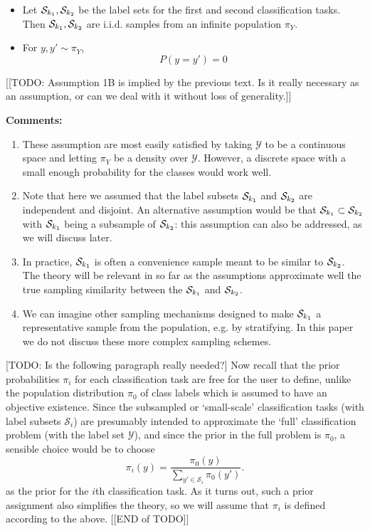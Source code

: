 \documentclass[12pt]{article}
\begin{document}
\begin{itemize}
\item[Assumption 1A] Let $\mathcal{S}_{k_1}, \mathcal{S}_{k_2}$ be the label sets
for the first and second classification tasks. Then $\mathcal{S}_{k_1}, 
\mathcal{S}_{k_2}$ are i.i.d. samples from an infinite population $\pi_Y$.
\item[Assumption 1B] For $y,y'\sim \pi_Y$, 
\[P(y=y')=0\]
\end{itemize}
[[TODO: Assumption 1B is implied by the previous text. Is it really necessary as an assumption, or can we deal with it without loss of generality.]]

\textbf{Comments:}
\begin{enumerate}
\item These assumption are most easily satisfied by taking $\mathcal{Y}$ 
to be a continuous space and letting $\pi_Y$ be a density over $\mathcal{Y}$. However, a discrete space with a small enough 
probability for the classes would work well. 
\item Note that here we assumed that the label subsets $\mathcal{S}_{k_1}$ and
$\mathcal{S}_{k_2}$ are independent and disjoint. An alternative
assumption would be that $\mathcal{S}_{k_1} \subset
\mathcal{S}_{k_2}$ with $\mathcal{S}_{k_1}$ being a subsample of
$\mathcal{S}_{k_2}$: this assumption can also be addressed, as we will
discuss later.
\item 
In practice, $\mathcal{S}_{k_1}$ is often a convenience sample meant to be similar to $\mathcal{S}_{k_2}$. The theory will be relevant in so far as the assumptions approximate well the true sampling similarity between the $\mathcal{S}_{k_1}$ and $\mathcal{S}_{k_2}$. 
\item We can imagine other sampling mechanisms designed to make $\mathcal{S}_{k_1}$ a representative sample from the population, e.g. by stratifying. In this paper we do not discuss these more complex sampling schemes. 
\end{enumerate}

[TODO: Is the following paragraph really needed?]
Now recall that the prior probabilities $\pi_i$ for each
classification task are free for the user to define, unlike the
population distribution $\pi_0$ of class labels which is assumed to
have an objective existence.  Since the subsampled or `small-scale'
classification tasks (with label subsets $\mathcal{S}_i$) are
presumably intended to approximate the `full' classification problem
(with the label set $\mathcal{Y}$), and since the prior in the full
problem is $\pi_0$, a sensible choice would be to choose
\[
\pi_i(y) = \frac{\pi_0(y)}{\sum_{y' \in \mathcal{S}_i} \pi_0(y')}.
\]
as the prior for the $i$th classification task.  As it turns out, such
a prior assignment also simplifies the theory, so we will assume that
$\pi_i$ is defined according to the above.
[[END of TODO]]
\end{document}
